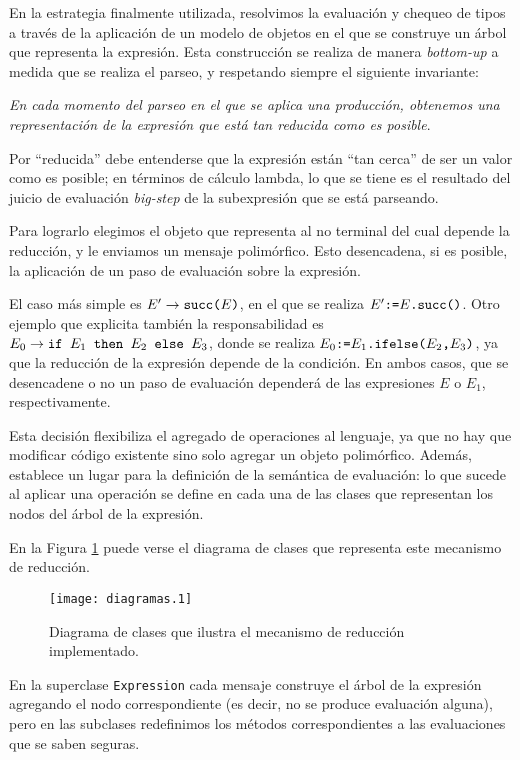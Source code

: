 \documentclass[11pt]{article}
\begin{document}
En la estrategia finalmente utilizada, resolvimos la evaluación y chequeo de tipos a través de la aplicación de un modelo de objetos en el que se construye un árbol que representa la expresión. Esta construcción se realiza de manera \emph{bottom-up} a medida que se realiza el parseo, y respetando siempre el siguiente invariante:

\emph{En cada momento del parseo en el que se aplica una producción, obtenemos una representación de la expresión que está tan reducida como es posible}.

Por ``reducida'' debe entenderse que la expresión están ``tan cerca'' de ser un
valor como es posible; en términos de cálculo lambda, lo que se tiene es el
resultado del juicio de evaluación \emph{big-step} de la subexpresión que
se está parseando.

Para lograrlo elegimos el objeto que representa al no terminal del cual depende la reducción, y le enviamos un mensaje polimórfico. Esto desencadena, si es posible, la aplicación de un paso de evaluación sobre la expresión.

El caso más simple es $E' \rightarrow \verb|succ(|E\verb|)|$, en el que se realiza
$E' \verb|:=| E\verb|.succ()|$. Otro ejemplo que explicita también la responsabilidad es $E_0 \rightarrow \verb|if | E_1 \verb| then | E_2 \verb| else | E_3$, donde se realiza
$E_0 \verb|:=| E_1 \verb|.ifelse(| E_2 \verb|,| E_3 \verb|)|$, ya que la reducción de la expresión depende de la condición. En ambos casos, que se desencadene o no un paso de evaluación dependerá de las expresiones $E$ o $E_1$, respectivamente.

Esta decisión flexibiliza el agregado de operaciones al lenguaje, ya que no hay que modificar código existente sino solo agregar un objeto polimórfico. Además, establece un lugar para la definición de la semántica de evaluación: lo que sucede al aplicar una operación se define en cada una de las clases que representan los nodos del árbol de la expresión.

En la Figura \ref{fig:diagrama-clases} puede verse el diagrama de clases que representa este mecanismo de reducción.

\begin{figure}[h] \centering
\texttt{[image: diagramas.1]}
\caption{Diagrama de clases que ilustra el mecanismo de reducción
	implementado.}
\label{fig:diagrama-clases}
\end{figure}

En la superclase \lstinline|Expression| cada mensaje construye el árbol de la expresión agregando el nodo correspondiente (es decir, no se produce evaluación alguna), pero en las subclases redefinimos los métodos correspondientes a las evaluaciones que se saben seguras. 
\end{document}
